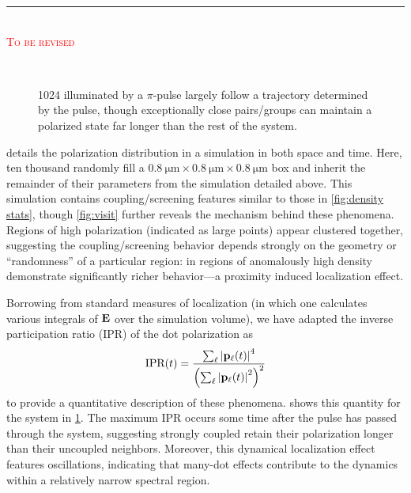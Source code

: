 \begin{center}
  \textcolor{red}{\rule{5cm}{1.4pt} \\ \textsc{To be revised}}
\end{center}

\begin{figure}
  \centering
  \subfloat[\label{fig:nearfield box}Spatial distribution of polarization at $t = \SI{12}{\pico\second}$. Each point depicts $\abs{\tilde{\rho}_{01}}^2$ at that location wtih both size and color.]{} \\
  \caption{\label{fig:polarization vis}
    1024 \qds{} illuminated by a $\pi$-pulse largely follow a trajectory determined by the pulse, though exceptionally close pairs/groups can maintain a polarized state far longer than the rest of the system.
  }
\end{figure}

 details the polarization distribution in a simulation in both space and time.
Here, ten thousand \qds{} randomly fill a $\SI{0.8}{\micro\meter} \times \SI{0.8}{\micro\meter} \times \SI{0.8}{\micro\meter}$ box and inherit the remainder of their parameters from the simulation detailed above.
This simulation contains coupling/screening features similar to those in \cref{fig:density stats},
though \cref{fig:visit} further reveals the mechanism behind these phenomena.
Regions of high polarization (indicated as large points) appear clustered together, suggesting the coupling/screening behavior depends strongly on the geometry or ``randomness'' of a particular region: \qds{} in regions of anomalously high density demonstrate significantly richer behavior---a proximity induced localization effect.

Borrowing from standard measures of localization (in which one calculates various integrals of $\vb{E}$ over the simulation volume), we have adapted the inverse participation ratio (IPR)  of the dot polarization as
\begin{equation}
  \text{IPR}(t) = \frac{\sum_\ell \abs{\vb{p}_\ell(t)}^4}{\qty(\sum_\ell \abs{\vb{p}_\ell(t)}^2)^2}
  \label{eq:ipr}
\end{equation}
to provide a quantitative description of these phenomena.
 shows this quantity for the system in \cref{fig:polarization vis}.
The maximum IPR occurs some time after the pulse has passed through the system, suggesting strongly coupled \qds{} retain their polarization longer than their uncoupled neighbors. Moreover, this dynamical localization effect features oscillations, indicating that many-dot effects contribute to the dynamics within a relatively narrow spectral region.

